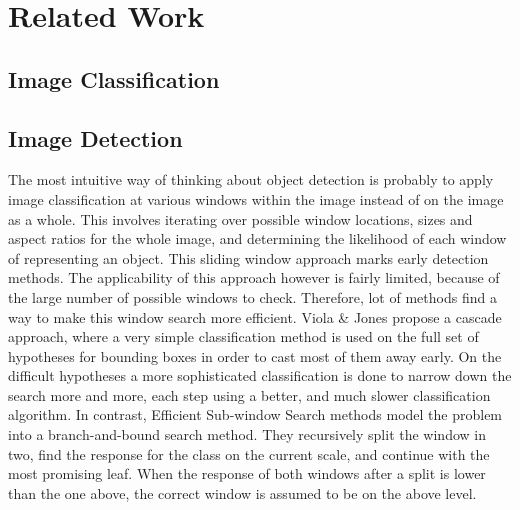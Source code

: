 \section{Related Work} %
\label{cha:related_work}

\subsection{Image Classification} %
\label{sec:image_classification}


\subsection{Image Detection} %
\label{sec:image_detection}



The most intuitive way of thinking about object detection is probably to apply image classification at various windows within the image instead of on the image as a whole. This involves iterating over possible window locations, sizes and aspect ratios for the whole image, and determining the likelihood of each window of representing an object. This sliding window approach marks early detection methods.\cite{viola2004robust} The applicability of this approach however is fairly limited, because of the large number of possible windows to check. Therefore, lot of methods find a way to make this window search more efficient. Viola \& Jones\cite{viola2004robust} propose a cascade approach, where a very simple classification method is used on the full set of hypotheses for bounding boxes in order to cast most of them away early. On the difficult hypotheses a more sophisticated classification is done to narrow down the search more and more, each step using a better, and much slower classification algorithm. In contrast, Efficient Sub-window Search methods\cite{ lampert2008beyond, yeh2009fast, pedersoli2011coarse, behmo2010towards} model the problem into a branch-and-bound search method. They recursively split the window in two, find the response for the class on the current scale, and continue with the most promising leaf. When the response of both windows after a split is lower than the one above, the correct window is assumed to be on the above level.

